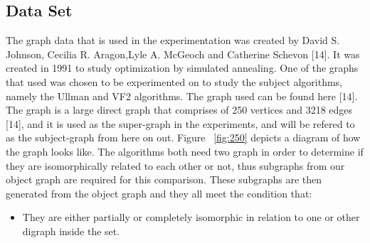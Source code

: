 \subsection{Data Set}
\label{Data Set}

The graph data that is used in the experimentation was created by David S. Johnson, Cecilia R. Aragon,Lyle A. McGeoch and Catherine Schevon [14]. 
It was created in 1991 to study optimization by simulated annealing. One of the graphs that used was chosen to be experimented on to study the subject
algorithms, namely the Ullman and VF2 algorithms. The graph used can be found here [14].\newline\newline
The graph is a large direct graph that comprises of 250 vertices and 3218 edges [14], and it is used as the super-graph in the experiments, 
and will be refered to as the subject-graph from here on out. Figure ~\ref{fig:250} depicts a diagram of how the graph looks like.\newline\newline
The algorithms both need two graph in order to determine if they are isomorphically related to each other or not, thus subgraphs from our object graph
are required for this comparison. These subgraphs are then generated from the object graph and they all meet the condition that:
\begin{itemize}
  \item They are either partially or completely isomorphic in relation to one or other digraph inside the set.
\end{itemize}

